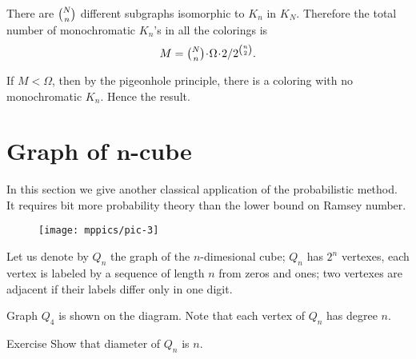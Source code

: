 There are $\tbinom Nn$ different subgraphs isomorphic to $K_n$ in $K_N$.
Therefore the total number of monochromatic $K_n$'s in all the colorings 
is 
\[M=\tbinom Nn\cdot\Omega\cdot  2/2^{\binom n2}.\]

If $M<\Omega$, then by the pigeonhole principle,
there is a coloring with no monochromatic $K_n$.
Hence the result.
\qeds

%

\section*{Graph of $\bm{n}$-cube}

In this section we give another classical application of the probabilistic method.
It requires bit more probability theory than the lower bound on Ramsey number. 

\begin{wrapfigure}{r}{25mm}
\vskip-0mm
\centering
\texttt{[image: mppics/pic-3]}
\vskip-0mm
\end{wrapfigure}

Let us denote by $Q_n$ the graph of the $n$-dimesional cube;
$Q_n$ has $2^n$ vertexes, each vertex is labeled by a sequence of length $n$ from zeros and ones;
two vertexes are adjacent if their labels differ only in one digit.

Graph $Q_4$ is shown on the diagram.
Note that each vertex of $Q_n$ has degree $n$.


\begin{thm}{Exercise}
Show that diameter of $Q_n$ is $n$. 
\end{thm}


